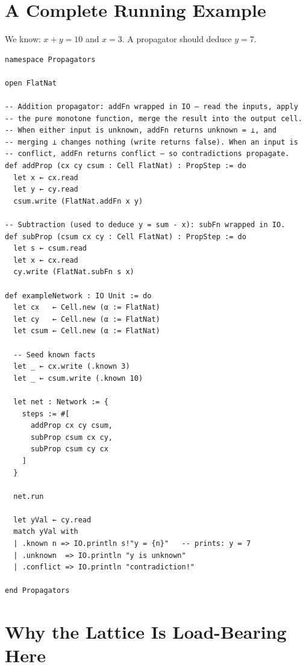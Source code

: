 \documentclass[12pt, a4paper, openright]{book}
\theoremstyle{thmstyle}
\theoremstyle{defstyle}
\newenvironment{exbox}[1][]{%
  \begin{tcolorbox}[exbox, title={Example\ifx\\#1\\\else\ --- #1\fi}]%
}{\end{tcolorbox}}
\begin{document}
\section{A Complete Running Example}

\begin{exbox}[Arithmetic propagation]
  We know: $x + y = 10$ and $x = 3$. A propagator should deduce $y = 7$.
\end{exbox}

\begin{verbatim}
namespace Propagators

open FlatNat

-- Addition propagator: addFn wrapped in IO — read the inputs, apply
-- the pure monotone function, merge the result into the output cell.
-- When either input is unknown, addFn returns unknown = ⊥, and
-- merging ⊥ changes nothing (write returns false). When an input is
-- conflict, addFn returns conflict — so contradictions propagate.
def addProp (cx cy csum : Cell FlatNat) : PropStep := do
  let x ← cx.read
  let y ← cy.read
  csum.write (FlatNat.addFn x y)

-- Subtraction (used to deduce y = sum - x): subFn wrapped in IO.
def subProp (csum cx cy : Cell FlatNat) : PropStep := do
  let s ← csum.read
  let x ← cx.read
  cy.write (FlatNat.subFn s x)

def exampleNetwork : IO Unit := do
  let cx   ← Cell.new (α := FlatNat)
  let cy   ← Cell.new (α := FlatNat)
  let csum ← Cell.new (α := FlatNat)

  -- Seed known facts
  let _ ← cx.write (.known 3)
  let _ ← csum.write (.known 10)

  let net : Network := {
    steps := #[
      addProp cx cy csum,
      subProp csum cx cy,
      subProp csum cy cx
    ]
  }

  net.run

  let yVal ← cy.read
  match yVal with
  | .known n => IO.println s!"y = {n}"   -- prints: y = 7
  | .unknown  => IO.println "y is unknown"
  | .conflict => IO.println "contradiction!"

end Propagators
\end{verbatim}

\section{Why the Lattice Is Load-Bearing Here}
\end{document}
